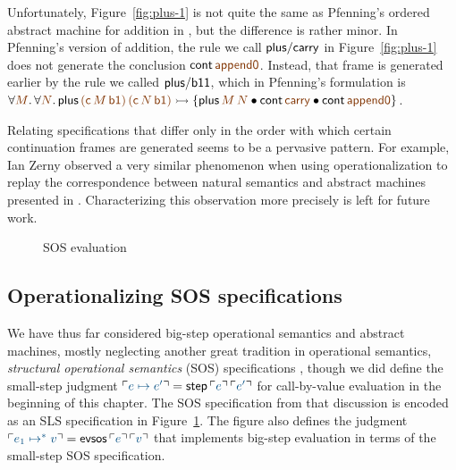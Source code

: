Unfortunately, Figure~\ref{fig:plus-1} is not quite the same as Pfenning's 
ordered abstract machine for addition in \cite{pfenning12ordered}, but the
difference is rather minor. In Pfenning's version of addition, the rule
we call ${\sf plus/carry}$ in Figure~\ref{fig:plus-1} does not generate
the conclusion ${\sf cont}\,\lf{\sf append0}$. Instead, that frame 
is generated earlier by the rule we called
${\sf plus/b11}$, which in Pfenning's formulation is
$\forall\lf{M}.\,\forall\lf{N}.\,
  {\sf plus}\,\lf{({\sf c}\,M\,{\sf b1})}\,\lf{({\sf c}\,N\,{\sf b1})}
  \lefti
  \{
    {\sf plus}\,\lf{M}\,\lf{N}
    \fuse
    {\sf cont}\,\lf{\sf carry}
    \fuse
    {\sf cont}\,\lf{\sf append0}
  \}$. 
%

Relating 
%
specifications that differ only in the order with which certain
continuation frames are generated seems to be a pervasive pattern. For
example, Ian Zerny observed a very similar phenomenon when using
operationalization to replay the correspondence between natural
semantics and abstract machines presented in
\cite{danvy12interderiving}. Characterizing this observation more
precisely is left for future work.


\begin{figure}[tp]
\begin{minipage}[b]{0.9\linewidth}
\end{minipage}
\caption{SOS evaluation}
\label{fig:cbv-sos-b}
\end{figure}

\subsection{Operationalizing SOS specifications}
\label{sec:evaluationcontexts}


We have thus far considered big-step operational semantics and
abstract machines, mostly neglecting another great tradition in
operational semantics, {\it structural operational semantics} (SOS)
specifications \cite{plotkin04structural}, though we did define the
small-step judgment $\interp{e \mapsto e'} = {\sf
  step}\,\interp{e}\,\interp{e'}$ for call-by-value evaluation in the
beginning of this chapter.  The SOS specification from 
that discussion is encoded as an
SLS specification in Figure~\ref{fig:cbv-sos-b}. The figure also
defines the judgment $\interp{e_1 \mapsto^* v} = {\sf
  evsos}\,\interp{e}\,\interp{v}$ that implements big-step evaluation
in terms of the small-step SOS specification.



